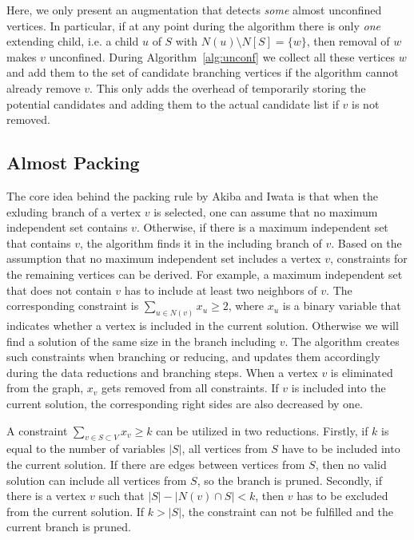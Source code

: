 \documentclass[a4paper,UKenglish,cleveref, autoref, thm-restate]{lipics-v2021}
\begin{document}
Here, we only present an augmentation that detects \emph{some} almost
unconfined vertices. In particular, if at any point during the algorithm there
is only \emph{one} extending child, i.e. a child $u$ of $S$ with $N(u)\setminus
N[S] = \{w\}$, then removal of $w$ makes $v$ unconfined. During
Algorithm~\ref{alg:unconf} we collect all these vertices $w$ and add them to the
set of candidate branching vertices if the algorithm cannot already remove $v$.
This only adds the overhead of temporarily storing the potential candidates and
adding them to the actual candidate list if $v$ is not removed.


\subsection{Almost Packing}\label{sec:almost_packing}

The core idea behind the packing rule by Akiba and Iwata \cite{AkibaIwata} is
that when the exluding branch of a vertex $v$ is selected, one
can assume that no maximum independent set contains $v$. Otherwise, if there is
a maximum independent set that contains $v$, the algorithm finds it in the including branch of $v$. Based on the assumption that no maximum independent
set includes a vertex $v$, constraints for the remaining vertices can be
derived. For example, a maximum independent set that does not contain $v$ has to
include at least two neighbors of $v$. The corresponding constraint is
$\sum_{u\in N(v)}x_u \geq2$, where $x_u$ is a binary variable that indicates
whether a vertex is included in the current solution. Otherwise we will find a
solution of the same size in the branch including $v$. The algorithm creates such
constraints when branching or reducing, and updates them accordingly during the data reductions and branching steps. When a vertex $v$ is eliminated from the graph, $x_v$ gets removed from all constraints. If $v$ is included into the current solution, the corresponding right sides are also decreased by one.

A constraint $\sum_{v\in S\subset V}x_v\geq k$ can be utilized in two
reductions. Firstly, if $k$ is equal to the number of variables $|S|$, all
vertices from $S$ have to be included into the current solution. If there are
edges between vertices from $S$, then no valid solution can include all vertices
from $S$, so the branch is pruned. Secondly, if there is a vertex $v$ such that $|S|-|N(v)\cap S| < k$, then $v$ has to be excluded from the current solution. If $k > |S|$, the constraint can not be fulfilled and the current branch is pruned.
\end{document}
